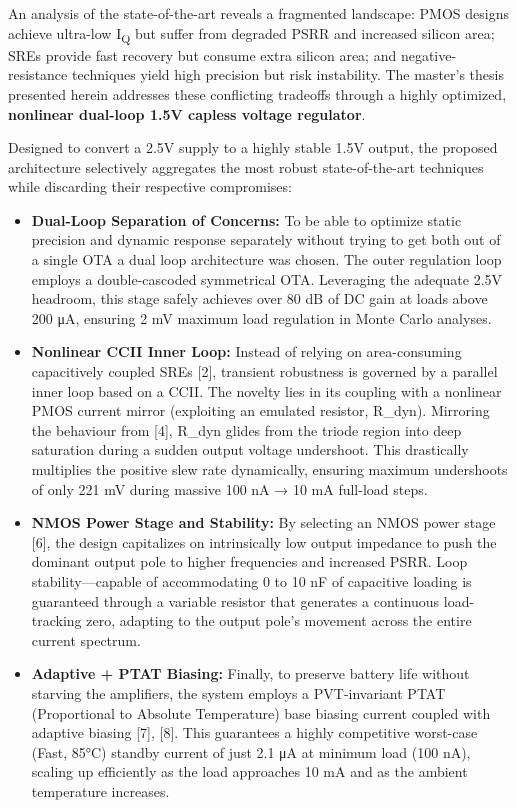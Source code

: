 \documentclass[
]{article}
\begin{document}
An analysis of the state-of-the-art reveals a fragmented landscape: PMOS
designs achieve ultra-low I\textsubscript{Q} but suffer from degraded
PSRR and increased silicon area; SREs provide fast recovery but consume
extra silicon area; and negative-resistance techniques yield high
precision but risk instability. The master's thesis presented herein
addresses these conflicting tradeoffs through a highly optimized,
\textbf{nonlinear dual-loop 1.5V capless voltage regulator}.

Designed to convert a 2.5V supply to a highly stable 1.5V output, the
proposed architecture selectively aggregates the most robust
state-of-the-art techniques while discarding their respective
compromises:

\begin{itemize}
\item
  \textbf{Dual-Loop Separation of Concerns:} To be able to optimize
  static precision and dynamic response separately without trying to get
  both out of a single OTA a dual loop architecture was chosen. The
  outer regulation loop employs a double-cascoded symmetrical OTA.
  Leveraging the adequate 2.5V headroom, this stage safely achieves over
  80 dB of DC gain at loads above 200 μA, ensuring 2 mV maximum load
  regulation in Monte Carlo analyses.
\item
  \textbf{Nonlinear CCII Inner Loop:} Instead of relying on
  area-consuming capacitively coupled SREs {[}2{]}, transient robustness
  is governed by a parallel inner loop based on a CCII. The novelty lies
  in its coupling with a nonlinear PMOS current mirror (exploiting an
  emulated resistor, R\_dyn). Mirroring the behaviour from {[}4{]},
  R\_dyn glides from the triode region into deep saturation during a
  sudden output voltage undershoot. This drastically multiplies the
  positive slew rate dynamically, ensuring maximum undershoots of only
  221 mV during massive 100 nA → 10 mA full-load steps.
\item
  \textbf{NMOS Power Stage and Stability:} By selecting an NMOS power
  stage {[}6{]}, the design capitalizes on intrinsically low output
  impedance to push the dominant output pole to higher frequencies and
  increased PSRR. Loop stability---capable of accommodating 0 to 10 nF
  of capacitive loading is guaranteed through a variable resistor that
  generates a continuous load-tracking zero, adapting to the output
  pole's movement across the entire current spectrum.
\item
  \textbf{Adaptive + PTAT Biasing:} Finally, to preserve battery life
  without starving the amplifiers, the system employs a PVT-invariant
  PTAT (Proportional to Absolute Temperature) base biasing current
  coupled with adaptive biasing {[}7{]}, {[}8{]}. This guarantees a
  highly competitive worst-case (Fast, 85°C) standby current of just 2.1
  μA at minimum load (100 nA), scaling up efficiently as the load
  approaches 10 mA and as the ambient temperature increases.
\end{itemize}
\end{document}
